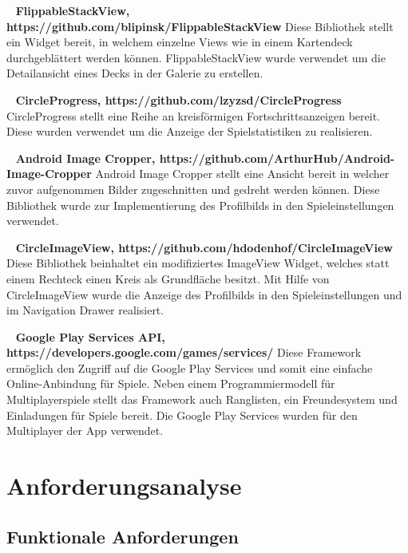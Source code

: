 \documentclass{scrartcl}
\begin{document}
\ \newline
\textbf{FlippableStackView, https://github.com/blipinsk/FlippableStackView} \newline
Diese Bibliothek stellt ein Widget bereit, in welchem einzelne Views wie in
einem Kartendeck durchgeblättert werden können. FlippableStackView wurde
verwendet um die Detailansicht eines Decks in der Galerie zu erstellen.

\ \newline
\textbf{CircleProgress, https://github.com/lzyzsd/CircleProgress} \newline
CircleProgress stellt eine Reihe an kreisförmigen Fortschrittsanzeigen bereit.
Diese wurden verwendet um die Anzeige der Spielstatistiken zu realisieren.

\ \newline
\textbf{Android Image Cropper, https://github.com/ArthurHub/Android-Image-Cropper} \newline
Android Image Cropper stellt eine Ansicht bereit in welcher zuvor aufgenommen
Bilder zugeschnitten und gedreht werden können. Diese Bibliothek wurde zur
Implementierung des Profilbilds in den Spieleinstellungen verwendet.

\ \newline
\textbf{CircleImageView, https://github.com/hdodenhof/CircleImageView} \newline
Diese Bibliothek beinhaltet ein modifiziertes ImageView Widget, welches statt
einem Rechteck einen Kreis als Grundfläche besitzt. Mit Hilfe von
CircleImageView wurde die Anzeige des Profilbilds in den Spieleinstellungen und
im Navigation Drawer realisiert.

\ \newline
\textbf{Google Play Services API, https://developers.google.com/games/services/} \newline
Diese Framework ermöglich den Zugriff auf die Google Play Services und somit
eine einfache Online-Anbindung für Spiele. Neben einem Programmiermodell für
Multiplayerspiele stellt das Framework auch Ranglisten, ein Freundesystem und
Einladungen für Spiele bereit. Die Google Play Services wurden für den
Multiplayer der App verwendet.


\section{Anforderungsanalyse}
\subsection{Funktionale Anforderungen}
\end{document}
